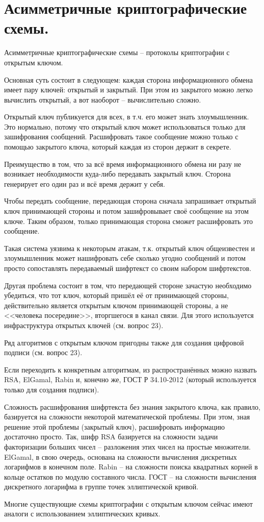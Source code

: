 \section{Асимметричные криптографические схемы.}

Асимметричные криптографические схемы -- протоколы криптографии с открытым ключом.

Основная суть состоит в следующем: каждая сторона информационного обмена имеет пару ключей: открытый и закрытый. При этом из закрытого можно легко вычислить открытый, а вот наоборот -- вычислительно сложно. 

Открытый ключ публикуется для всех, в т.ч. его может знать злоумышленник. Это нормально, потому что открытый ключ может использоваться только для зашифрования сообщений. Расшифровать такое сообщение можно только с помощью закрытого ключа, который каждая из сторон держит в секрете. 

Преимущество в том, что за всё время информационного обмена ни разу не возникает необходимости куда-либо передавать закрытый ключ. Сторона генерирует его один раз и всё время держит у себя. 

Чтобы передать сообщение, передающая сторона сначала запрашивает открытый ключ принимающей стороны и потом зашифровывает своё сообщение на этом ключе. Таким образом, только принимающая сторона сможет расшифровать это сообщение.

Такая система уязвима к некоторым атакам, т.к. открытый ключ общеизвестен и злоумышленник может нашифровать себе сколько угодно сообщений и потом просто сопоставлять передаваемый шифртекст со своим набором шифртекстов. 

Другая проблема состоит в том, что передающей стороне зачастую необходимо убедиться, что тот ключ, который пришёл её от принимающей стороны, действительно является открытым ключом принимающей стороны, а не <<человека посередине>>, вторгшегося в канал связи. Для этого используется инфраструктура открытых ключей (см. вопрос 23).

Ряд алгоритмов с открытым ключом пригодны также для создания цифровой подписи (см. вопрос 23).

Если переходить к конкретным алгоритмам, из распространённых можно назвать RSA, ElGamal, Rabin и, конечно же, ГОСТ Р 34.10-2012 (который используется только для создания подписи). 

Сложность расшифрования шифртекста без знания закрытого ключа, как правило, базируется на сложности некоторой математической проблемы. При этом, зная решение этой проблемы (закрытый ключ), расшифровать информацию достаточно просто. Так, шифр RSA базируется на сложности задачи факторизации больших чисел -- разложения этих чисел на простые множители. ElGamal, в свою очередь, основана на сложности вычисления дискретных логарифмов в конечном поле. Rabin -- на сложности поиска квадратных корней в кольце остатков по модулю составного числа. ГОСТ -- на сложности вычисления дискретного логарифма в группе точек эллиптической кривой. 

Многие существующие схемы криптографии с открытым ключом сейчас имеют аналоги с использованием эллиптических кривых.